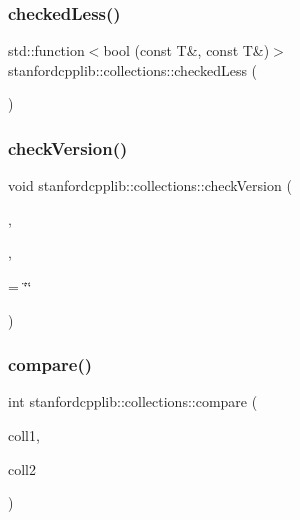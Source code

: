 \subsubsection{\texorpdfstring{checked\+Less()}{checkedLess()}}
{\footnotesize\ttfamily std\+::function$<$bool (const T\&, const T\&)$>$ stanfordcpplib\+::collections\+::checked\+Less (\begin{DoxyParamCaption}{ }\end{DoxyParamCaption})}

\mbox{\label{namespacestanfordcpplib_1_1collections_a91290b45c9efbe37b0c013fddfc8e4c4}} 
\subsubsection{\texorpdfstring{check\+Version()}{checkVersion()}}
{\footnotesize\ttfamily void stanfordcpplib\+::collections\+::check\+Version (\begin{DoxyParamCaption}\item[{const Collection\+Type \&}]{,  }\item[{const Iterator\+Type \&}]{,  }\item[{const std\+::string \&}]{ = {\ttfamily \char`\"{}\char`\"{}} }\end{DoxyParamCaption})}

\mbox{\label{namespacestanfordcpplib_1_1collections_a6d113dfaa3d28a3894990c64411ff03c}} 
\subsubsection{\texorpdfstring{compare()}{compare()}}
{\footnotesize\ttfamily int stanfordcpplib\+::collections\+::compare (\begin{DoxyParamCaption}\item[{const Collection\+Type \&}]{coll1,  }\item[{const Collection\+Type \&}]{coll2 }\end{DoxyParamCaption})}

